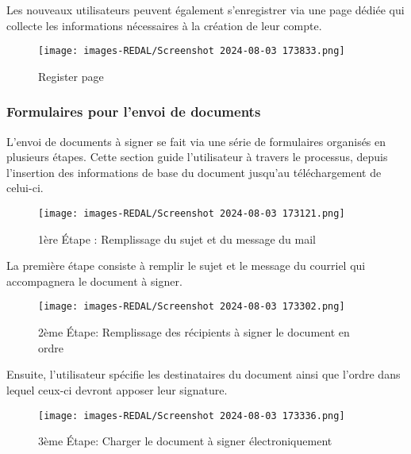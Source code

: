 Les nouveaux utilisateurs peuvent également s'enregistrer via une page dédiée qui collecte les informations nécessaires à la création de leur compte.

\begin{figure}[H]
\begin{center}
\texttt{[image: images-REDAL/Screenshot 2024-08-03 173833.png]}
\end{center}
\caption{Register page}
\end{figure}

\subsubsection{Formulaires pour l'envoi de documents}

L'envoi de documents à signer se fait via une série de formulaires organisés en plusieurs étapes. Cette section guide l'utilisateur à travers le processus, depuis l'insertion des informations de base du document jusqu'au téléchargement de celui-ci.

\begin{figure}[H]
\begin{center}
\texttt{[image: images-REDAL/Screenshot 2024-08-03 173121.png]}
\end{center}
\caption{1ère Étape : Remplissage du sujet et du message du mail}
\end{figure}

La première étape consiste à remplir le sujet et le message du courriel qui accompagnera le document à signer.

\begin{figure}[H]
\begin{center}
\texttt{[image: images-REDAL/Screenshot 2024-08-03 173302.png]}
\end{center}
\caption{2ème Étape: Remplissage des récipients à signer le document en ordre}
\end{figure}

Ensuite, l'utilisateur spécifie les destinataires du document ainsi que l'ordre dans lequel ceux-ci devront apposer leur signature.

\begin{figure}[H]
\begin{center}
\texttt{[image: images-REDAL/Screenshot 2024-08-03 173336.png]}
\end{center}
\caption{3ème Étape: Charger le document à signer électroniquement}
\end{figure}

